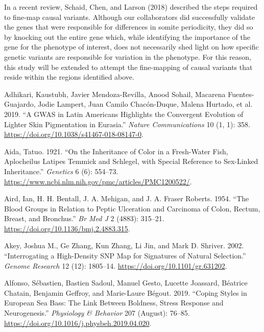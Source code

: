 \documentclass[
]{book}
\newlength{\cslhangindent}
\newlength{\cslentryspacingunit} %
\newenvironment{CSLReferences}[2] %
 {%
  \setlength{\parindent}{0pt}
  \ifodd #1
  \let\oldpar\par
  \def\par{\hangindent=\cslhangindent\oldpar}
  \fi
  \setlength{\parskip}{#2\cslentryspacingunit}
 }%
 {}
\begin{document}
In a recent review, Schaid, Chen, and Larson (2018) described the steps required to fine-map causal variants. Although our collaborators did successfully validate the genes that were responsible for differences in somite periodicity, they did so by knocking out the entire gene which, while identifying the importance of the gene for the phenotype of interest, does not necessarily shed light on how specific genetic variants are responsible for variation in the phenotype. For this reason, this study will be extended to attempt the fine-mapping of causal variants that reside within the regions identified above.

\hypertarget{refs}{}
\begin{CSLReferences}{1}{0}
\leavevmode{}%
Adhikari, Kaustubh, Javier Mendoza-Revilla, Anood Sohail, Macarena Fuentes-Guajardo, Jodie Lampert, Juan Camilo Chacón-Duque, Malena Hurtado, et al. 2019. {``A {GWAS} in {Latin Americans} Highlights the Convergent Evolution of Lighter Skin Pigmentation in {Eurasia}.''} \emph{Nature Communications} 10 (1, 1): 358. \url{https://doi.org/10.1038/s41467-018-08147-0}.

\leavevmode{}%
Aida, Tatuo. 1921. {``On the {Inheritance} of {Color} in a {Fresh-Water Fish}, {Aplocheilus Latipes Temmick} and {Schlegel}, with {Special Reference} to {Sex-Linked Inheritance}.''} \emph{Genetics} 6 (6): 554--73. \url{https://www.ncbi.nlm.nih.gov/pmc/articles/PMC1200522/}.

\leavevmode{}%
Aird, Ian, H. H. Bentall, J. A. Mehigan, and J. A. Fraser Roberts. 1954. {``The {Blood Groups} in {Relation} to {Peptic Ulceration} and {Carcinoma} of {Colon}, {Rectum}, {Breast}, and {Bronchus}.''} \emph{Br Med J} 2 (4883): 315--21. \url{https://doi.org/10.1136/bmj.2.4883.315}.

\leavevmode{}%
Akey, Joshua M., Ge Zhang, Kun Zhang, Li Jin, and Mark D. Shriver. 2002. {``Interrogating a {High-Density SNP Map} for {Signatures} of {Natural Selection}.''} \emph{Genome Research} 12 (12): 1805--14. \url{https://doi.org/10.1101/gr.631202}.

\leavevmode{}%
Alfonso, Sébastien, Bastien Sadoul, Manuel Gesto, Lucette Joassard, Béatrice Chatain, Benjamin Geffroy, and Marie-Laure Bégout. 2019. {``Coping Styles in {European} Sea Bass: {The} Link Between Boldness, Stress Response and Neurogenesis.''} \emph{Physiology \& Behavior} 207 (August): 76--85. \url{https://doi.org/10.1016/j.physbeh.2019.04.020}.


\end{CSLReferences}
\end{document}
